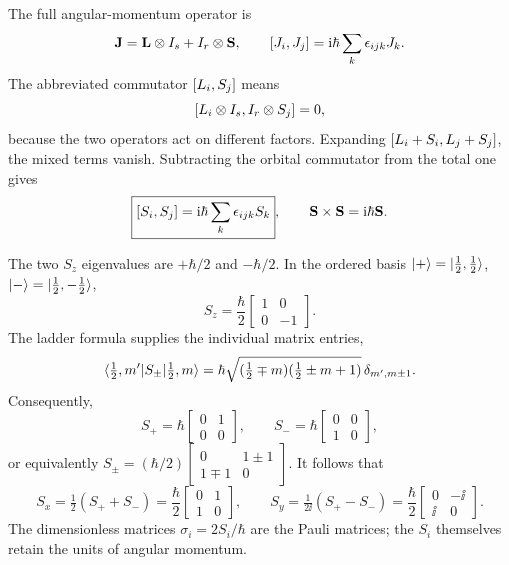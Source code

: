 The full angular-momentum operator is
\[
 \mathbf J=\mathbf L\otimes I_s+I_r\otimes\mathbf S,
 \qquad \left[J_i,J_j\right]=\mathrm{i}\hbar\sum_k\epsilon_{ijk}J_k.
\]
The abbreviated commutator $\left[L_i,S_j\right]$ means
\[
 \left[L_i\otimes I_s,I_r\otimes S_j\right]=0,
\]
because the two operators act on different factors. Expanding
$\left[L_i+S_i,L_j+S_j\right]$, the mixed terms vanish. Subtracting the
orbital commutator from the total one gives
\[
 \boxed{\left[S_i,S_j\right]=\mathrm{i}\hbar\sum_k\epsilon_{ijk}S_k},\qquad
 \mathbf S\times\mathbf S=\mathrm{i}\hbar\mathbf S.
\]

The two $S_z$ eigenvalues are $+\hbar/2$ and $-\hbar/2$.
In the ordered basis
$\lvert +\rangle=\lvert \tfrac12,\tfrac12\rangle$,
$\lvert -\rangle=\lvert \tfrac12,-\tfrac12\rangle$,
\[
 S_z=\frac\hbar2\begin{bmatrix}1&0\\0&-1\end{bmatrix}.
\]
The ladder formula supplies the individual matrix entries,
\[
 \langle \tfrac12,m'\rvert S_\pm\lvert \tfrac12,m\rangle
 =\hbar\sqrt{(\tfrac12\mp m)(\tfrac12\pm m+1)}\,
   \delta_{m',m\pm1}.
\]
Consequently,
\[
 S_+=\hbar\begin{bmatrix}0&1\\0&0\end{bmatrix},\qquad
 S_-=\hbar\begin{bmatrix}0&0\\1&0\end{bmatrix},
\]
or equivalently
$S_\pm=(\hbar/2)\begin{bmatrix}0&1\pm1\\1\mp1&0\end{bmatrix}$.
It follows that
\[
 S_x=\tfrac12(S_++S_-)
 =\frac\hbar2\begin{bmatrix}0&1\\1&0\end{bmatrix},\qquad
 S_y=\tfrac1{2\ii}(S_+-S_-)
 =\frac\hbar2\begin{bmatrix}0&-\ii\\\ii&0\end{bmatrix}.
\]
The dimensionless matrices $\sigma_i=2S_i/\hbar$ are the Pauli
matrices; the $S_i$ themselves retain the units of angular momentum.
